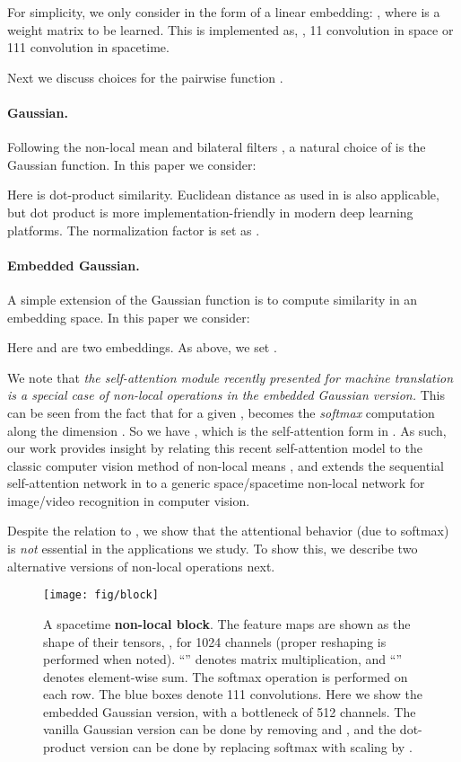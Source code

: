 \documentclass[10pt,twocolumn,letterpaper]{article}
\def\x{}
\begin{document}
For simplicity, we only consider  in the form of a linear embedding: , where  is a weight matrix to be learned. This is implemented as, \eg, 1\x1 convolution in space or 1\x1\x1 convolution in spacetime.

Next we discuss choices for the pairwise function .

\paragraph{Gaussian.} Following the non-local mean \cite{Buades2005} and bilateral filters \cite{Tomasi1998}, a natural choice of  is the Gaussian function. In this paper we consider:

Here  is dot-product similarity. Euclidean distance as used in \cite{Buades2005,Tomasi1998} is also applicable, but dot product is more implementation-friendly in modern deep learning platforms. The normalization factor is set as .

\paragraph{Embedded Gaussian.} A simple extension of the Gaussian function is to compute similarity in an embedding space. In this paper we consider:

Here  and  are two embeddings. As above, we set .

We note that \emph{the self-attention module \cite{Vaswani2017} recently presented for machine translation is a special case of non-local operations in the embedded Gaussian version.}
This can be seen from the fact that for a given ,  becomes the \emph{softmax} computation along the dimension . So we have , which is the self-attention form in \cite{Vaswani2017}.
As such, our work provides insight by relating this recent self-attention model to the classic computer vision method of non-local means \cite{Buades2005}, and  extends the sequential self-attention network in \cite{Vaswani2017} to a generic space/spacetime non-local network for image/video recognition in computer vision.

Despite the relation to \cite{Vaswani2017}, we show that the attentional behavior (due to softmax) is \emph{not} essential in the applications we study. To show this, we describe two alternative versions of non-local operations next.

\begin{figure}[t]
\centering
\texttt{[image: fig/block]}
\caption{A spacetime \textbf{non-local block}. The feature maps are shown as the shape of their tensors, \eg, \x\x\x for 1024 channels (proper reshaping is performed when noted). ``'' denotes matrix multiplication, and ``'' denotes element-wise sum. The softmax operation is performed on each row. The blue boxes denote 1\x1\x1 convolutions. Here we show the embedded Gaussian version, with a bottleneck of 512 channels. The vanilla Gaussian version can be done by removing  and , and the dot-product version can be done by replacing softmax with scaling by .}
\label{fig:block}
\end{figure}
\end{document}

